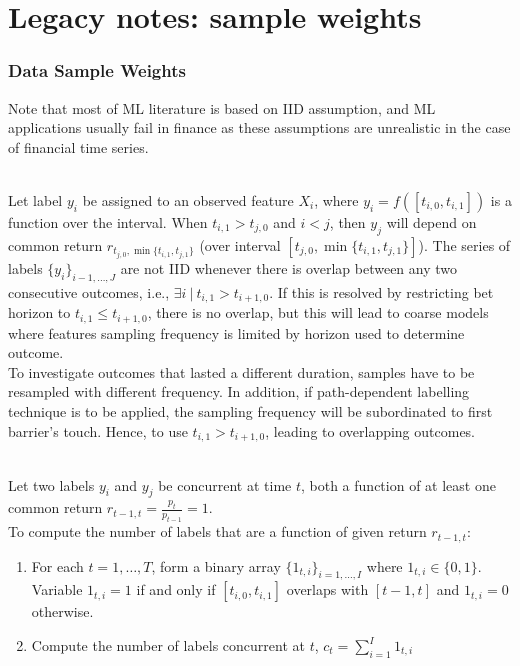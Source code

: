 \documentclass[a4paper,oneside,openany]{book}
\begin{document}
\chapter*{Legacy notes: sample weights}

\subsection*{Data Sample Weights}

Note that most of ML literature is based on IID assumption, and ML applications usually fail in finance as these assumptions are unrealistic in the case of financial time series.

\begin{remark} \\
Let label $y_i$ be assigned to an observed feature $X_i$, where $y_i = f([t_{i,0}, t_{i,1}])$ is a function over the interval. When $t_{i,1} > t_{j,0}$ and $i < j$, then $y_j$ will depend on common return $r_{t_{j,0}, \min\{t_{i,1}, t_{j,1}\}}$ (over interval $[t_{j,0}, \min\{t_{i,1}, t_{j,1}\}]$). The series of labels $\{y_i \}_{i-1, \ldots, J}$ are not IID whenever there is overlap between any two consecutive outcomes, i.e., $\exists i \ \vert \ t_{i,1} > t_{i+1, 0}$. If this is resolved by restricting bet horizon to $t_{i,1} \leq t_{i+1, 0}$, there is no overlap, but this will lead to coarse models where features sampling frequency is limited by horizon used to determine outcome.\\
To investigate outcomes that lasted a different duration, samples have to be resampled with different frequency. In addition, if path-dependent labelling technique is to be applied, the sampling frequency will be subordinated to first barrier's touch. Hence, to use $t_{i,1} > t_{i+1, 0}$, leading to overlapping outcomes.
\end{remark}

\begin{method} \\
Let two labels $y_i$ and $y_j$ be concurrent at time $t$, both a function of at least one common return $r_{t-1, t} = \frac{p_t}{p_{t-1}} = 1$.\\
To compute the number of labels that are a function of given return $r_{t-1, t}$:
\begin{enumerate}[label=\roman*.]
\setlength{\itemsep}{0pt}
\item For each $t = 1, \ldots, T$, form a binary array $\{1_{t,i}\}_{i=1, \ldots, I}$ where $1_{t, i} \in \{0,1 \}$.\\
Variable $1_{t,i} = 1$ if and only if $[t_{i,0}, t_{i,1}]$ overlaps with $[t-1, t]$ and $1_{t,i}=0$ otherwise.
\item Compute the number of labels concurrent at $t$, $c_t = \sum\limits_{i=1}^I 1_{t,i}$
\end{enumerate}
\end{method}
\end{document}
